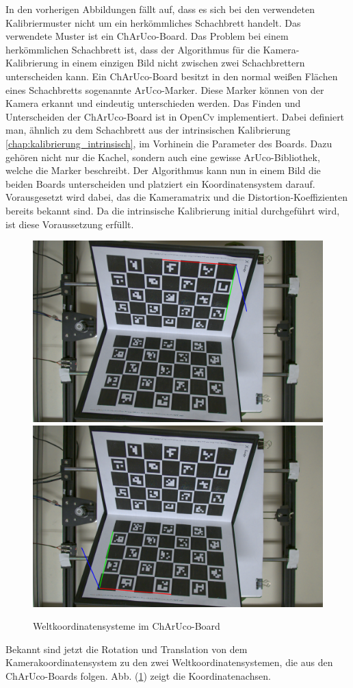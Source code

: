 		In den vorherigen Abbildungen fällt auf, dass es sich bei den verwendeten Kalibriermuster nicht um ein herkömmliches Schachbrett handelt. Das verwendete Muster ist ein ChArUco-Board. Das Problem bei einem herkömmlichen Schachbrett ist, dass der Algorithmus für die Kamera-Kalibrierung in einem einzigen Bild nicht zwischen zwei Schachbrettern unterscheiden kann. Ein ChArUco-Board besitzt in den normal weißen Flächen eines Schachbretts sogenannte ArUco-Marker. Diese Marker können von der Kamera erkannt und eindeutig unterschieden werden. Das Finden und Unterscheiden der ChArUco-Board ist in OpenCv implementiert. Dabei definiert man, ähnlich zu dem Schachbrett aus der intrinsischen Kalibrierung \ref{chap:kalibrierung_intrinsisch}, im Vorhinein die Parameter des Boards. Dazu gehören nicht nur die Kachel, sondern auch eine gewisse ArUco-Bibliothek, welche die Marker beschreibt. Der Algorithmus kann nun in einem Bild die beiden Boards unterscheiden und platziert ein Koordinatensystem darauf. Vorausgesetzt wird dabei, das die Kameramatrix und die Distortion-Koeffizienten bereits bekannt sind. Da die intrinsische Kalibrierung initial durchgeführt wird, ist diese Voraussetzung erfüllt.  
		
		\begin{figure}[h]
			\centering
			\includegraphics[width=0.49\linewidth]{img/hauptteil/ext-calib/charuco_primary.png}
			\includegraphics[width=0.49\linewidth]{img/hauptteil/ext-calib/charuco_secondary.png}
			\caption{Weltkoordinatensysteme im ChArUco-Board}
			\label{fig:ext-calib-poses}
		\end{figure}
	
		Bekannt sind jetzt die Rotation und Translation von dem Kamerakoordinatensystem zu den zwei Weltkoordinatensystemen, die aus den ChArUco-Boards folgen. Abb. (\ref{fig:ext-calib-poses}) zeigt die Koordinatenachsen. 
		
